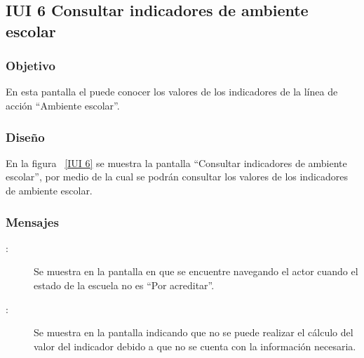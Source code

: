 \subsection{IUI 6 Consultar indicadores de ambiente escolar}
\subsubsection{Objetivo}
	
	En esta pantalla el  puede conocer los valores de los indicadores
	de la línea de acción ``Ambiente escolar''.	

\subsubsection{Diseño}

    En la figura ~\ref{IUI 6} se muestra la pantalla ``Consultar indicadores de ambiente escolar'', por medio de la cual 
    se podrán consultar los valores de los indicadores de ambiente escolar.


\subsubsection{Mensajes}

	
\begin{description}
	\item[:] Se muestra en la pantalla en que se encuentre navegando el actor cuando el estado de la escuela no es ``Por acreditar''.
	\item[:] Se muestra en la pantalla  indicando que no se puede realizar el cálculo del valor del indicador
				     debido a que no se cuenta con la información necesaria.
\end{description}
